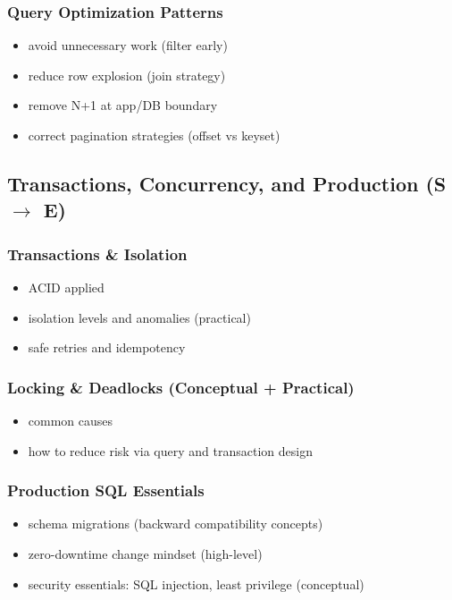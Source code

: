 \subsubsection{Query Optimization Patterns}
\begin{itemize}
    \item avoid unnecessary work (filter early)
    \item reduce row explosion (join strategy)
    \item remove N+1 at app/DB boundary
    \item correct pagination strategies (offset vs keyset)
\end{itemize}

\newpage
\subsection{Transactions, Concurrency, and Production (S $\rightarrow$ E)}

\subsubsection{Transactions \& Isolation}
\begin{itemize}
    \item ACID applied
    \item isolation levels and anomalies (practical)
    \item safe retries and idempotency
\end{itemize}

\subsubsection{Locking \& Deadlocks (Conceptual + Practical)}
\begin{itemize}
    \item common causes
    \item how to reduce risk via query and transaction design
\end{itemize}

\subsubsection{Production SQL Essentials}
\begin{itemize}
    \item schema migrations (backward compatibility concepts)
    \item zero-downtime change mindset (high-level)
    \item security essentials: SQL injection, least privilege (conceptual)
\end{itemize}